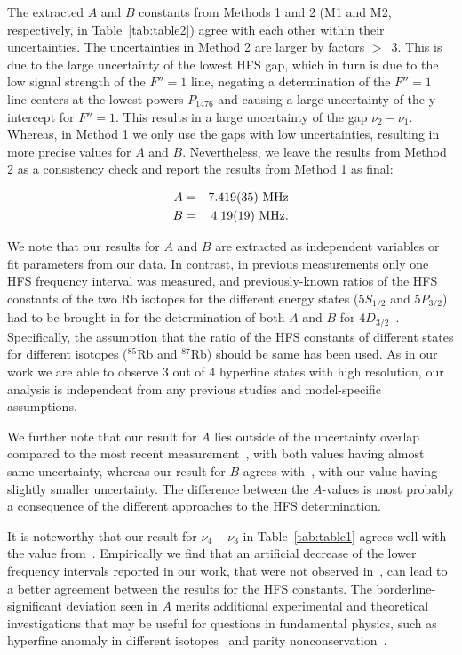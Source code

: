 \documentclass[reprint, amsmath,amssymb, aps, pra, longbibliography]{revtex4-1}
\begin{document}
The extracted $A$ and $B$ constants from Methods 1 and 2 (M1 and M2, respectively, in Table~\ref{tab:table2}) agree with each other within their uncertainties. 
The uncertainties in Method 2 are larger by factors $>$~3. This is due to the large
uncertainty of the lowest HFS gap, which in turn is due to the low signal strength of the $F''=1$ line, negating a determination of the $F''=1$ line centers at the lowest powers $P_{1476}$ and causing a large uncertainty of the y-intercept for $F''=1$. This results in a large 
uncertainty of the gap $\nu_2-\nu_1$.    
Whereas, in Method 1 we only use the gaps with low uncertainties, resulting in more precise values for $A$ and $B$.
Nevertheless, we leave the results from Method 2 as a consistency check and report the results from Method 1 as final:

\begin{eqnarray}
A & = & 7.419(35)~{\rm{MHz}}\nonumber \\
B & = & 4.19(19) ~{\rm{MHz}}. \nonumber
\end{eqnarray} 



We note that our results for $A$ and $B$ are extracted as independent variables or fit parameters from our data. In contrast, in previous measurements only one HFS frequency interval was measured, and previously-known ratios of the HFS constants of the two Rb isotopes for the different energy states (5$S_{1/2}$ and 5$P_{3/2}$) had to be brought in for the determination of both $A$ and $B$ for 4$D_{3/2}$~\cite{moon2004, moon2009}. 
Specifically, the assumption that the ratio of the HFS constants of different states for different isotopes ($^{85}$Rb and $^{87}$Rb) should be same has been used. As in our work we are able to observe 3 out of 4 hyperfine states with high resolution, our analysis is independent from any previous studies and  model-specific assumptions.

We further note that our result for $A$ lies outside of the uncertainty overlap compared to the most recent measurement~\cite{moon2009}, with both values having almost same uncertainty, whereas our result for $B$ agrees with~\cite{moon2009}, with our value having slightly smaller uncertainty. The difference between the $A$-values is most probably a consequence of the different approaches to the HFS determination. 


It is noteworthy that our result for $\nu_{4} - \nu_3$ 
in Table~\ref{tab:table1} agrees well with the value from~\cite{moon2009}. Empirically we find that an artificial decrease of the lower frequency intervals reported in our work, that were not observed in~\cite{moon2009}, can lead to a better agreement between the results for the HFS constants. The borderline-significant deviation seen in $A$ merits additional experimental and theoretical investigations that may be useful for questions in fundamental physics, such as hyperfine anomaly in different isotopes~\cite{wang2014} and parity nonconservation~\cite{roberts2014}. 
\end{document}
